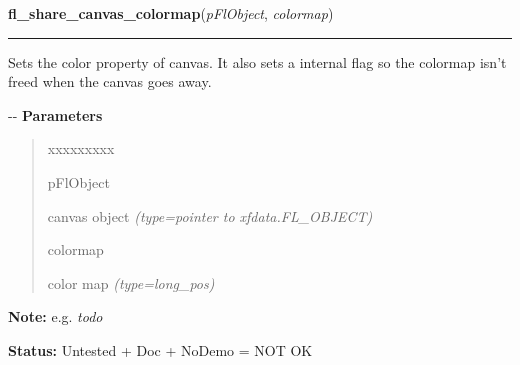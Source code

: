 \hspace{.8\funcindent}\begin{boxedminipage}{\funcwidth}

    \raggedright \textbf{fl\_share\_canvas\_colormap}(\textit{pFlObject}, \textit{colormap})

    \vspace{-1.5ex}

    \rule{\textwidth}{0.5\fboxrule}
\setlength{\parskip}{2ex}

Sets the color property of canvas. It also sets a internal flag so the
colormap isn't freed when the canvas goes away.

-{}-
\setlength{\parskip}{1ex}
      \textbf{Parameters}
      \vspace{-1ex}

      \begin{quote}
        \begin{Ventry}{xxxxxxxxx}

          \item[pFlObject]


canvas object
            {\it (type=pointer to xfdata.FL\_OBJECT)}

          \item[colormap]


color map
            {\it (type=long\_pos)}

        \end{Ventry}

      \end{quote}

\textbf{Note:} 
e.g. \emph{todo}


\textbf{Status:} 
Untested + Doc + NoDemo = NOT OK


    \end{boxedminipage}

    \label{xformslib:flcanvas:fl_clear_canvas}

    \vspace{0.5ex}

